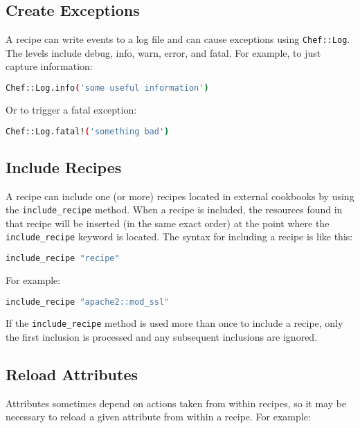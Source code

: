 \subsection{Create Exceptions}

A recipe can write events to a log file and can cause exceptions using \lstinline!Chef::Log!. The levels include debug, info, warn, error, and fatal. For example, to just capture information:

\begin{lstlisting}[language=Bash,label=lst:cookbook-recipes8]
Chef::Log.info('some useful information')
\end{lstlisting}

Or to trigger a fatal exception:

\begin{lstlisting}[language=Bash,label=lst:cookbook-recipes9]
Chef::Log.fatal!('something bad')
\end{lstlisting}

\subsection{Include Recipes}

A recipe can include one (or more) recipes located in external cookbooks by using the \lstinline!include_recipe! method. When a recipe is included, the resources found in that recipe will be inserted (in the same exact order) at the point where the \lstinline!include_recipe! keyword is located. The syntax for including a recipe is like this:

\begin{lstlisting}[language=Bash,label=lst:cookbook-recipes10]
include_recipe "recipe"
\end{lstlisting}

For example:

\begin{lstlisting}[language=Bash,label=lst:cookbook-recipes11]
include_recipe "apache2::mod_ssl"
\end{lstlisting}

If the \lstinline!include_recipe! method is used more than once to include a recipe, only the first inclusion is processed and any subsequent inclusions are ignored.

\subsection{Reload Attributes}

Attributes sometimes depend on actions taken from within recipes, so it may be necessary to reload a given attribute from within a recipe. For example:

